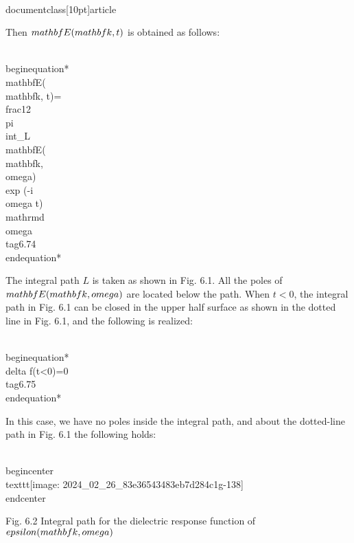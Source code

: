\\documentclass[10pt]{article}
\begin{document}
{{{{Then $\\mathbf{E}(\\mathbf{k}, t)$ is obtained as follows:


\\begin{equation*}
\\mathbf{E}(\\mathbf{k}, t)=\\frac{1}{2 \\pi} \\int_{L} \\mathbf{E}(\\mathbf{k}, \\omega) \\exp (-i \\omega t) \\mathrm{d} \\omega \\tag{6.74}
\\end{equation*}


The integral path $L$ is taken as shown in Fig. 6.1. All the poles of $\\mathbf{E}(\\mathbf{k}, \\omega)$ are located below the path. When $t<0$, the integral path in Fig. 6.1 can be closed in the upper half surface as shown in the dotted line in Fig. 6.1, and the following is realized:


\\begin{equation*}
\\delta f(t<0)=0 \\tag{6.75}
\\end{equation*}


In this case, we have no poles inside the integral path, and about the dotted-line path in Fig. 6.1 the following holds:

\\begin{center}
\\texttt{[image: 2024\_02\_26\_83e36543483eb7d284c1g-138]}
\\end{center}

Fig. 6.2 Integral path for the dielectric response function of $\\epsilon(\\mathbf{k}, \\omega)$


}}}}
\end{document}
